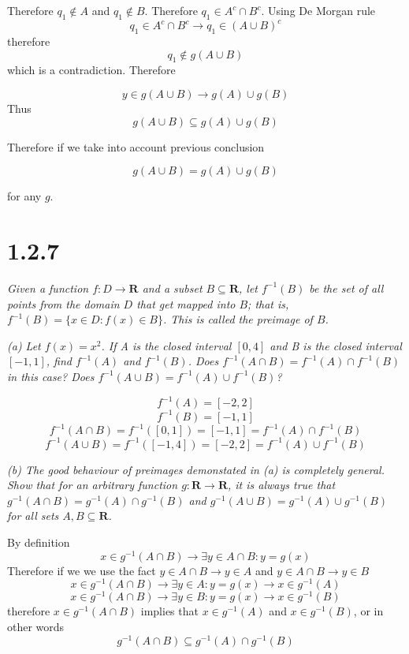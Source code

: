 \documentclass[11pt,oneside,titlepage]{book}
\begin{document}
Therefore $q_1 \notin A$ and $q_1 \notin B$. Therefore $q_1 \in A^c \cap B^c$.
Using De Morgan rule
$$q_1 \in A^c \cap B^c \to q_1 \in (A \cup B)^c$$
therefore 
$$q_1 \notin g(A \cup B)$$
which is a contradiction. Therefore

$$y \in g(A \cup B) \to g(A) \cup g(B)$$
Thus
$$g(A \cup B) \subseteq g(A) \cup g(B)$$

Therefore if we take into account previous conclusion

$$g(A \cup B) = g(A) \cup g(B)$$

for any $g$.

\section*{1.2.7}

\textit{Given a function $f: D \to \textbf{R}$ and a subset $B
  \subseteq \textbf{R}$, let $f^{-1}(B)$ be the set of all points
  from the domain $D$ that get mapped into $B$; that is,
  $f^{-1}(B) = \{x \in D: f(x) \in B\}$. This is called
  the preimage of $B$.}

\textit{(a) Let $f(x) = x^2$. If A is the closed interval $[0,4]$ and B is the
  closed interval $[-1, 1]$, find $f^{-1}(A)$ and $f^{-1}(B)$. Does
  $f^{-1}(A \cap B) = f^{-1}(A) \cap f^{-1}(B)$ in this case? Does
  $f^{-1}(A \cup B) = f^{-1}(A) \cup f^{-1}(B)$?
}

$$f^{-1}(A) = [-2, 2]$$
$$f^{-1}(B) = [-1, 1]$$
$$f^{-1}(A \cap B) = f^{-1}([0, 1]) = [-1, 1] = f^{-1}(A) \cap f^{-1}(B)$$
$$f^{-1}(A \cup B) = f^{-1}([-1, 4]) = [-2, 2] = f^{-1}(A) \cup f^{-1}(B)$$

\textit{(b) The good behaviour of preimages demonstated in (a) is completely
  general. Show that for an arbitrary function $g: \textbf{R} \to \textbf{R}$,
  it is always true that $g^{-1}(A \cap B) = g^{-1}(A) \cap g^{-1}(B)$ and
  $g^{-1}(A \cup B) = g^{-1}(A) \cup g^{-1}(B)$ for all sets $A, B \subseteq \textbf{R}$.
}

By definition
$$ x \in g^{-1}(A \cap B) \to \exists y \in A \cap B: y = g(x)$$
Therefore if we we use the fact  $y \in A \cap B \to y \in A$ and $y \in A \cap B \to y \in B$
$$ x \in g^{-1}(A \cap B) \to \exists y \in A: y = g(x) \to x \in g^{-1}(A)$$
$$ x \in g^{-1}(A \cap B) \to \exists y \in B: y = g(x) \to x \in g^{-1}(B)$$
therefore $x \in g^{-1}(A \cap B)$ implies that $x \in g^{-1}(A)$ and $x \in g^{-1}(B)$, or in other words
$$g^{-1}(A \cap B) \subseteq g^{-1}(A) \cap g^{-1}(B)$$
\end{document}
